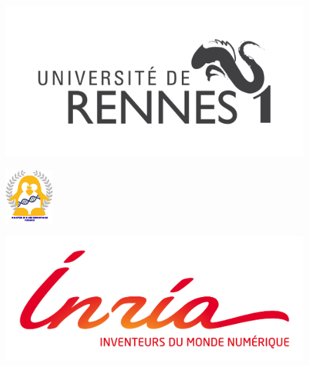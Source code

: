 \begin{titlepage}

    \begin{center}
      \begin{minipage}{\linewidth}
        \centering
        \begin{minipage}{0.21\linewidth}
          \begin{figure}[H]
            \centering
              \includegraphics[width=\linewidth]{pictures/Rennes1Logo.png}
          \end{figure}
        \end{minipage}
        \hspace{0.03\linewidth}
        \begin{minipage}{0.21\linewidth}
          \begin{figure}[H]
            \centering
            \includegraphics[width=50pt]{pictures/m1BILogo.jpg}
          \end{figure}
        \end{minipage}
        \hspace{0.03\linewidth}
          \begin{minipage}{0.21\linewidth}
              \begin{figure}[H]
                  \centering
                  \includegraphics[width=\linewidth]{pictures/InriaLogo.png}

\end{figure}
\end{minipage}
\end{minipage}
\end{center}
\end{titlepage}
